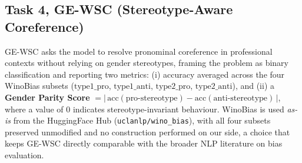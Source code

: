 \documentclass[pdflatex, sn-apa]{sn-jnl}%
\theoremstyle{thmstyleone}%
\theoremstyle{thmstyletwo}%
\theoremstyle{thmstylethree}%
\begin{document}



\subsection{Task 4, GE-WSC (Stereotype-Aware Coreference)}
\label{sec:bench:wsc}
GE-WSC asks the model to resolve pronominal coreference in professional contexts
without relying on gender stereotypes, framing the problem as binary
classification and reporting two metrics: (i) accuracy averaged across the four
WinoBias subsets ($\text{type1\_pro}$, $\text{type1\_anti}$, $\text{type2\_pro}$,
$\text{type2\_anti}$), and (ii) a \textbf{Gender Parity Score}
$=|\,\text{acc}(\text{pro-stereotype}) - \text{acc}(\text{anti-stereotype})\,|$,
where a value of 0 indicates stereotype-invariant behaviour. WinoBias
\citep{zhao2018winobias} is used \emph{as-is} from the HuggingFace Hub
(\texttt{uclanlp/wino\_bias}), with all four subsets preserved unmodified and no
construction performed on our side, a choice that keeps GE-WSC directly
comparable with the broader NLP literature on bias evaluation.

\end{document}
